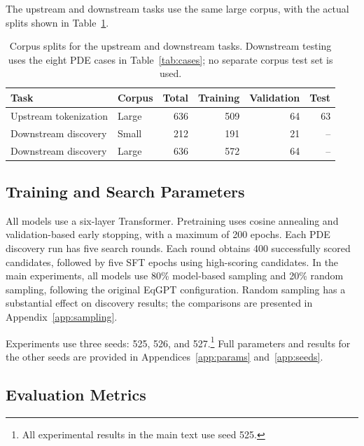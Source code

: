 \documentclass[11pt,letterpaper]{article}
\begin{document}
The upstream and downstream tasks use the same large corpus, with the actual splits shown in Table~\ref{tab:splits}.
\begin{table}[H]
\caption{Corpus splits for the upstream and downstream tasks. Downstream testing uses the eight PDE cases in Table~\ref{tab:cases}; no separate corpus test set is used.}\label{tab:splits}
\centering\small
\begin{tabular*}{\linewidth}{@{\extracolsep{\fill}}llrrrr@{}}\toprule
Task & Corpus & Total & Training & Validation & Test\\\midrule
Upstream tokenization & Large & 636 & 509 & 64 & 63\\
Downstream discovery & Small & 212 & 191 & 21 & --\\
Downstream discovery & Large & 636 & 572 & 64 & --\\\bottomrule
\end{tabular*}
\end{table}

\subsection{Training and Search Parameters}
All models use a six-layer Transformer. Pretraining uses cosine annealing and validation-based early stopping, with a maximum of 200 epochs. Each PDE discovery run has five search rounds. Each round obtains 400 successfully scored candidates, followed by five SFT epochs using high-scoring candidates. In the main experiments, all models use 80\% model-based sampling and 20\% random sampling, following the original EqGPT configuration. Random sampling has a substantial effect on discovery results; the comparisons are presented in Appendix~\ref{app:sampling}.

Experiments use three seeds: 525, 526, and 527.\footnote{All experimental results in the main text use seed 525.} Full parameters and results for the other seeds are provided in Appendices~\ref{app:params} and~\ref{app:seeds}.

\subsection{Evaluation Metrics}
\end{document}
